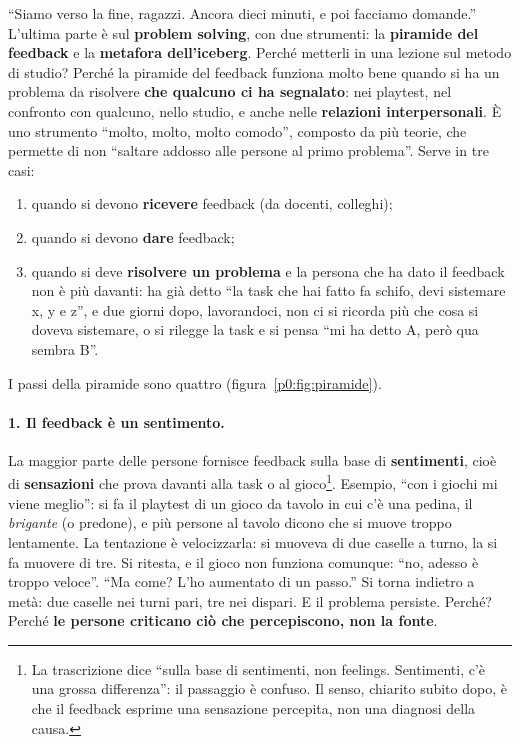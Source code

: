 ``Siamo verso la fine, ragazzi. Ancora dieci minuti, e poi facciamo
domande.'' L'ultima parte è sul \textbf{problem solving}, con due
strumenti: la \textbf{piramide del feedback} e la \textbf{metafora
dell'iceberg}. Perché metterli in una lezione sul metodo di studio? Perché
la piramide del feedback funziona molto bene quando si ha un problema da
risolvere \textbf{che qualcuno ci ha segnalato}: nei playtest, nel confronto
con qualcuno, nello studio, e anche nelle \textbf{relazioni
interpersonali}. È uno strumento ``molto, molto, molto comodo'', composto
da più teorie, che permette di non ``saltare addosso alle persone al primo
problema''. Serve in tre casi:
\begin{enumerate}
  \item quando si devono \textbf{ricevere} feedback (da docenti, colleghi);
  \item quando si devono \textbf{dare} feedback;
  \item quando si deve \textbf{risolvere un problema} e la persona che ha
        dato il feedback non è più davanti: ha già detto ``la task che hai
        fatto fa schifo, devi sistemare x, y e z'', e due giorni dopo,
        lavorandoci, non ci si ricorda più che cosa si doveva sistemare, o
        si rilegge la task e si pensa ``mi ha detto A, però qua sembra
        B''.
\end{enumerate}

I passi della piramide sono quattro (figura~\ref{p0:fig:piramide}).

\paragraph{1. Il feedback è un sentimento.} La maggior parte delle persone
fornisce feedback sulla base di \textbf{sentimenti}, cioè di
\textbf{sensazioni} che prova davanti alla task o al gioco\footnote{La
trascrizione dice ``sulla base di sentimenti, non feelings. Sentimenti, c'è
una grossa differenza'': il passaggio è confuso. Il senso, chiarito subito
dopo, è che il feedback esprime una sensazione percepita, non una diagnosi
della causa.}. Esempio, ``con i giochi mi viene meglio'': si fa il playtest
di un gioco da tavolo in cui c'è una pedina, il \emph{brigante} (o
predone), e più persone al tavolo dicono che si muove troppo lentamente. La
tentazione è velocizzarla: si muoveva di due caselle a turno, la si fa
muovere di tre. Si ritesta, e il gioco non funziona comunque: ``no, adesso è
troppo veloce''. ``Ma come? L'ho aumentato di un passo.'' Si torna indietro
a metà: due caselle nei turni pari, tre nei dispari. E il problema persiste.
Perché? Perché \textbf{le persone criticano ciò che percepiscono, non la
fonte}.

